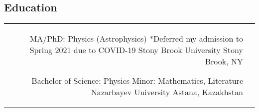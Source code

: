 \documentclass[10pt]{article} %
\begin{document}
\begin{paracol}{1}



\section{Education} 





\begin{supertabular}{rl} %

	
	
	
	{MA/PhD:} %
	{Physics (Astrophysics)} %
	{*Deferred my admission to Spring 2021 due to COVID-19} %
	{Stony Brook University} %
	{Stony Brook, NY}
	
	
	{Bachelor of Science:} %
	{Physics} %
	{Minor: Mathematics, Literature} %
	{Nazarbayev University} %
	{Astana, Kazakhstan}
	

\end{supertabular}


\end{paracol}
\end{document}
